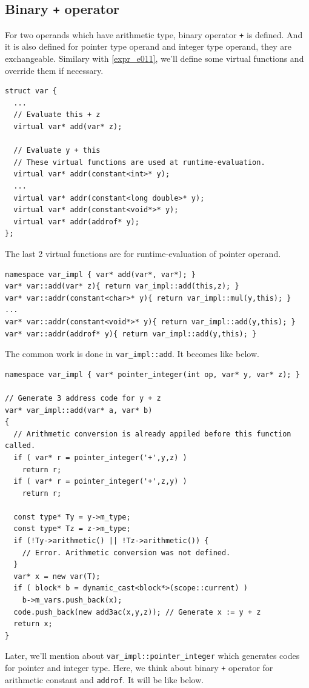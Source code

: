 \subsection{Binary {\tt{+}} operator}
\label{expr_e014}
For two operands which have arithmetic type, binary operator {\tt{+}}
is defined. And it is also defined for pointer type operand and integer type
operand, they are exchangeable. Similary with \ref{expr_e011}, we'll
define some virtual functions and override them if necessary.
\begin{verbatim}
struct var {
  ...
  // Evaluate this + z
  virtual var* add(var* z);

  // Evaluate y + this
  // These virtual functions are used at runtime-evaluation.
  virtual var* addr(constant<int>* y);
  ...
  virtual var* addr(constant<long double>* y);
  virtual var* addr(constant<void*>* y);
  virtual var* addr(addrof* y);
};
\end{verbatim}
The last 2 virtual functions are for runtime-evaluation of
pointer operand.
\begin{verbatim}
namespace var_impl { var* add(var*, var*); }
var* var::add(var* z){ return var_impl::add(this,z); }
var* var::addr(constant<char>* y){ return var_impl::mul(y,this); }
...
var* var::addr(constant<void*>* y){ return var_impl::add(y,this); }
var* var::addr(addrof* y){ return var_impl::add(y,this); }
\end{verbatim}
The common work is done in {\tt{var\_impl::add}}. It becomes like below.
\begin{verbatim}
namespace var_impl { var* pointer_integer(int op, var* y, var* z); }

// Generate 3 address code for y + z
var* var_impl::add(var* a, var* b)
{
  // Arithmetic conversion is already appiled before this function called.
  if ( var* r = pointer_integer('+',y,z) )
    return r;
  if ( var* r = pointer_integer('+',z,y) )
    return r;

  const type* Ty = y->m_type;
  const type* Tz = z->m_type;
  if (!Ty->arithmetic() || !Tz->arithmetic()) {
    // Error. Arithmetic conversion was not defined. 
  }
  var* x = new var(T);
  if ( block* b = dynamic_cast<block*>(scope::current) )
    b->m_vars.push_back(x);
  code.push_back(new add3ac(x,y,z)); // Generate x := y + z
  return x;
}
\end{verbatim}
Later, we'll mention about {\tt{var\_impl::pointer\_integer}}
which generates codes for pointer and integer type.
Here, we think about binary {\tt{+}} operator for
arithmetic constant and {\tt{addrof}}. It will be like below.
